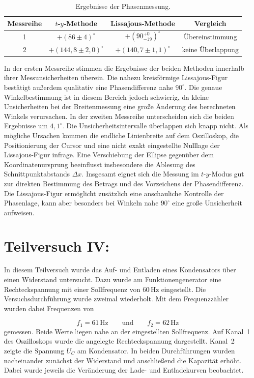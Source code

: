 \documentclass{report}
\begin{document}
\begin{table}[htbp]
\centering
\caption{Ergebnisse der Phasenmessung.}
\label{tab:results}
\begin{tabular}{c|c|c|c}
\hline
Messreihe & $t$-$y$-Methode & Lissajous-Methode & Vergleich\\
\hline
1 & $+(86\pm4)^\circ$ & $+\left(90^{+0}_{-19}\right)^\circ$ & Übereinstimmung\\
2 & $+(144{,}8\pm2{,}0)^\circ$ & $+(140{,}7\pm1{,}1)^\circ$ & keine Überlappung\\
\hline
\end{tabular}
\end{table}
\noindent
In der ersten Messreihe stimmen die Ergebnisse der beiden Methoden innerhalb ihrer Messunsicherheiten überein. Die nahezu kreisförmige Lissajous-Figur bestätigt außerdem qualitativ eine Phasendifferenz nahe $90^\circ$. Die genaue Winkelbestimmung ist in diesem Bereich jedoch schwierig, da kleine Unsicherheiten bei der Breitenmessung eine große Änderung des berechneten Winkels verursachen.
\noindent
In der zweiten Messreihe unterscheiden sich die beiden Ergebnisse um $4{,}1^\circ$. Die Unsicherheitsintervalle überlappen sich knapp nicht. Als mögliche Ursachen kommen die endliche Linienbreite auf dem Oszilloskop, die Positionierung der Cursor und eine nicht exakt eingestellte Nulllage der Lissajous-Figur infrage. Eine Verschiebung der Ellipse gegenüber dem Koordinatenursprung beeinflusst insbesondere die Ablesung des Schnittpunktabstands $\Delta x$.
\noindent
Insgesamt eignet sich die Messung im $t$-$y$-Modus gut zur direkten Bestimmung des Betrags und des Vorzeichens der Phasendifferenz. Die Lissajous-Figur ermöglicht zusätzlich eine anschauliche Kontrolle der Phasenlage, kann aber besonders bei Winkeln nahe $90^\circ$ eine große Unsicherheit aufweisen.




\newpage
\section{Teilversuch IV: }
\noindent
In diesem Teilversuch wurde das Auf- und Entladen eines Kondensators über einen Widerstand untersucht. Dazu wurde am Funktionengenerator eine Rechteckspannung mit einer Sollfrequenz von $60\,\mathrm{Hz}$ eingestellt. Die Versuchsdurchführung wurde zweimal wiederholt. Mit dem Frequenzzähler wurden dabei Frequenzen von

\begin{equation}
f_1=61\,\mathrm{Hz}
\qquad\text{und}\qquad
f_2=62\,\mathrm{Hz}
\end{equation}
\noindent
gemessen. Beide Werte liegen nahe an der eingestellten Sollfrequenz.
\noindent
Auf Kanal~1 des Oszilloskops wurde die angelegte Rechteckspannung dargestellt. Kanal~2 zeigte die Spannung $U_C$ am Kondensator. In beiden Durchführungen wurden nacheinander zunächst der Widerstand und anschließend die Kapazität erhöht. Dabei wurde jeweils die Veränderung der Lade- und Entladekurven beobachtet.
\end{document}

